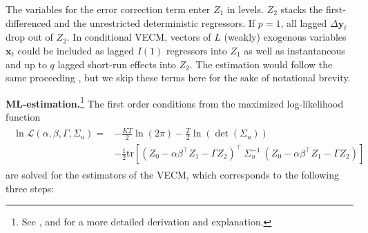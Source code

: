 The variables for the error correction term enter $ Z_1 $ in levels. $ Z_2 $ stacks the first-differenced and the unrestricted deterministic regressors. If $ p=1 $, all lagged $ \Delta \boldsymbol{y}_{t} $ drop out of $ Z_2 $. In conditional VECM, vectors of $ L $ (weakly) exogenous variables $ \boldsymbol{x}_t $ could be included as lagged $I(1)$ regressors into $ Z_1 $ as well as instantaneous and up to $ q $ lagged short-run effects into $ Z_2 $. The estimation would follow the same proceeding \citep[p.~398]{PesaranEtAl2000,Lutkepohl2005}, but we skip these terms here for the sake of notational brevity.


\textbf{ML-estimation.}\footnote{See \citet[Ch.~6]{Johansen1996}, \citet[Ch.~7.2.3]{Lutkepohl2005} and \citet[Ch.~3.1]{Lutkepohl2006} for a more detailed derivation and explanation.} The first order conditions from the maximized log-likelihood function
\begin{align} \label{eq:vecmLikeli}
\begin{split}
	\ln \mathcal{L} \left(\alpha, \beta, \Gamma, \Sigma_u \right) = & - \frac{KT}{2} \ln \left( 2\pi \right) - \frac{T}{2} \ln \left( \det ( \Sigma_u ) \right) \\
	& - \frac{1}{2} \text{tr} \left[ \left( Z_{0} - \alpha\beta^\top Z_{1} - \Gamma Z_{2} \right)^\top \ \Sigma_u^{-1} \ \left( Z_{0} - \alpha\beta^\top Z_{1} - \Gamma Z_{2} \right) \right]
\end{split}
\end{align} 
are solved for the estimators of the VECM, which corresponds to the following three steps:
